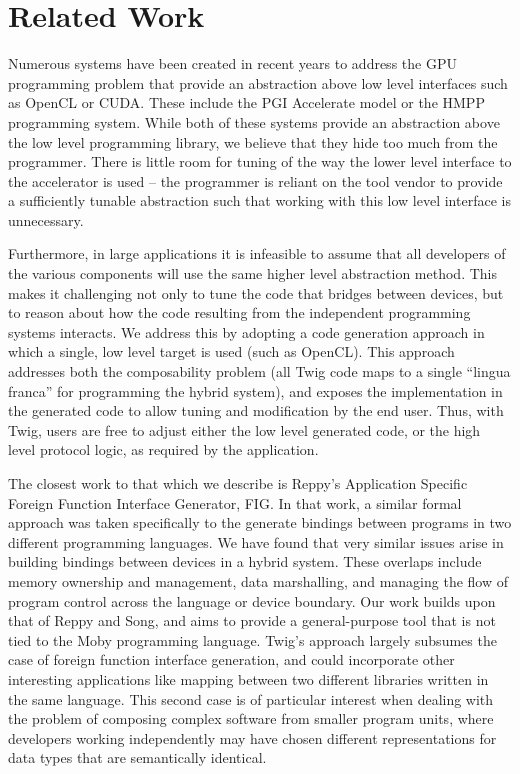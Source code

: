 
\section{Related Work}

Numerous systems have been created in recent years to address the GPU programming problem that provide an abstraction above low level interfaces such as OpenCL or CUDA. These include the PGI Accelerate model\cite{pgi-accelerate} or the HMPP programming system\cite{hmpp}. While both of these systems provide an abstraction above the low level programming library, we believe that they hide too much from the programmer. There is little room for tuning of the way the lower level interface to the accelerator is used -- the programmer is reliant on the tool vendor to provide a sufficiently tunable abstraction such that working with this low level interface is unnecessary.

Furthermore, in large applications it is infeasible to assume that all developers of the various components will use the same higher level abstraction method. This makes it challenging not only to tune the code that bridges between devices, but to reason about how the code resulting from the independent programming systems interacts. We address this by adopting a code generation approach in which a single, low level target is used (such as OpenCL). This approach addresses both the composability problem (all Twig code maps to a single ``lingua franca'' for programming the hybrid system), and exposes the implementation in the generated code to allow tuning and modification by the end user. Thus, with Twig, users are free to adjust either the low level generated code, or the high level protocol logic, as required by the application.

The closest work to that which we describe is Reppy's Application Specific Foreign Function Interface Generator, FIG\cite{reppy06fig}. In that work, a similar formal approach was taken specifically to the generate bindings between programs in two different programming languages. We have found that very similar issues arise in building bindings between devices in a hybrid system. These overlaps include memory ownership and management, data marshalling, and managing the flow of program control across the language or device boundary. Our work builds upon that of Reppy and Song, and aims to provide a general-purpose tool that is not tied to the Moby programming language. Twig's approach largely subsumes the case of foreign function interface generation, and could incorporate other interesting applications like mapping between two different libraries written in the same language. This second case is of particular interest when dealing with the problem of composing complex software from smaller program units, where developers working independently may have chosen different representations for data types that are semantically identical.


